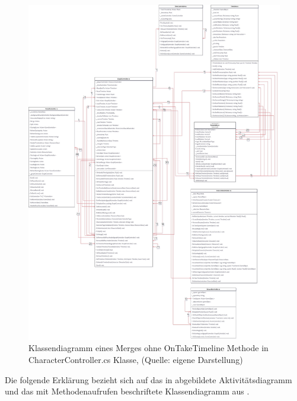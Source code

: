 \begin{figure}[p]
\centering
\includegraphics[width=1\linewidth]{content/pictures/merge_classes.jpg}
\caption{Klassendiagramm eines Merges ohne OnTakeTimeline Methode in CharacterController.cs Klasse, (Quelle: eigene Darstellung)}
\label{fig:merge-class}
\end{figure}

Die folgende Erklärung bezieht sich auf das in  abgebildete Aktivitätsdiagramm und das mit Methodenaufrufen beschriftete Klassendiagramm aus .

